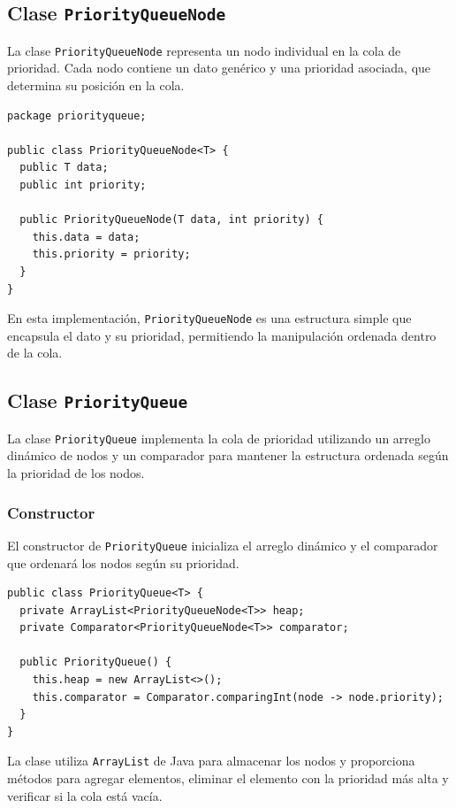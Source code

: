 \documentclass[10pt, a4paper]{article}
\newcommand{\mj}[1]{\texttt{#1}}
\begin{document}
\subsection{Clase \mj{PriorityQueueNode}}

La clase \mj{PriorityQueueNode} representa un nodo individual en la cola de prioridad. Cada nodo contiene un dato genérico y una prioridad asociada, que determina su posición en la cola.

\begin{verbatim}
package priorityqueue;

public class PriorityQueueNode<T> {
  public T data;
  public int priority;

  public PriorityQueueNode(T data, int priority) {
    this.data = data;
    this.priority = priority;
  }
}
\end{verbatim}

En esta implementación, \mj{PriorityQueueNode} es una estructura simple que encapsula el dato y su prioridad, permitiendo la manipulación ordenada dentro de la cola.

\subsection{Clase \mj{PriorityQueue}}

La clase \mj{PriorityQueue} implementa la cola de prioridad utilizando un arreglo dinámico de nodos y un comparador para mantener la estructura ordenada según la prioridad de los nodos.

\subsubsection{Constructor}

El constructor de \mj{PriorityQueue} inicializa el arreglo dinámico y el comparador que ordenará los nodos según su prioridad.

\begin{verbatim}
public class PriorityQueue<T> {
  private ArrayList<PriorityQueueNode<T>> heap;
  private Comparator<PriorityQueueNode<T>> comparator;

  public PriorityQueue() {
    this.heap = new ArrayList<>();
    this.comparator = Comparator.comparingInt(node -> node.priority);
  }
}
\end{verbatim}

La clase utiliza \mj{ArrayList} de Java para almacenar los nodos y proporciona métodos para agregar elementos, eliminar el elemento con la prioridad más alta y verificar si la cola está vacía.
\end{document}
